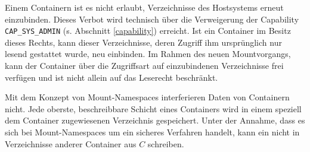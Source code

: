 \documentclass[../main.tex]{subfiles}
\begin{document}

			Einem Containern ist es nicht erlaubt, Verzeichnisse des Hostsystems erneut einzubinden. Dieses Verbot wird technisch über die Verweigerung der Capability \texttt{CAP\_SYS\_ADMIN} (s. Abschnitt \ref{capability}) erreicht. Ist ein Container im Besitz dieses Rechts, kann dieser Verzeichnisse, deren Zugriff ihm ursprünglich nur lesend gestattet wurde, neu einbinden. Im Rahmen des neuen Mountvorgangs, kann der Container über die Zugriffsart auf einzubindenen Verzeichnisse frei verfügen und ist nicht allein auf das Leserecht beschränkt.



			Mit dem Konzept von Mount-Namespaces interferieren Daten von Containern nicht. Jede oberste, beschreibbare Schicht eines Containers wird in einem speziell dem Container zugewiesenen Verzeichnis gespeichert. Unter der Annahme, dass es sich bei Mount-Namespaces um ein sicheres Verfahren handelt, kann ein \cbroken{} nicht in Verzeichnisse anderer Container aus \(C\) schreiben.




\end{document}
